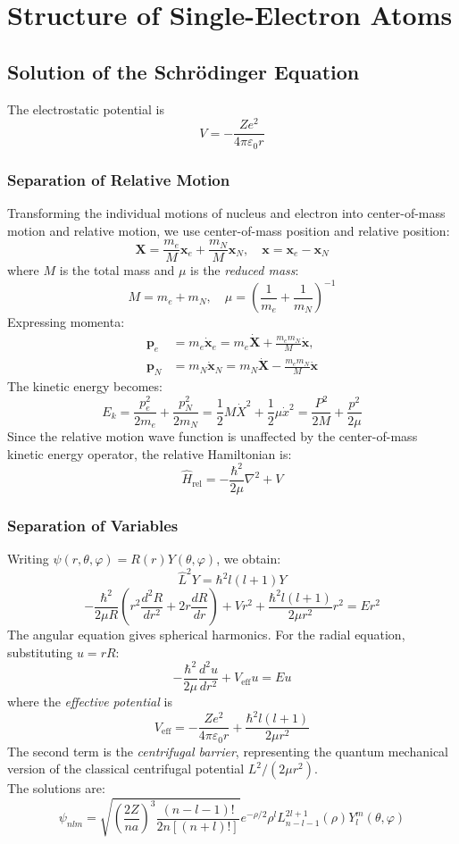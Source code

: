 \chapter{Structure of Single-Electron Atoms}



\section{Solution of the Schrödinger Equation}

The electrostatic potential is
\[
V = -\frac{Ze^2}{4\pi\varepsilon_0 r}
\]

\subsection{Separation of Relative Motion}

Transforming the individual motions of nucleus and electron into center-of-mass motion and relative motion, we use center-of-mass position and relative position:
\[
\mathbf{X} = \frac{m_e}{M}\mathbf{x}_e + \frac{m_N}{M}\mathbf{x}_N,
\quad
\mathbf{x} = \mathbf{x}_e - \mathbf{x}_N
\]
where $M$ is the total mass and $\mu$ is the \emph{reduced mass}:
\[
M = m_e + m_N, \quad \mu = \left(\frac{1}{m_e} + \frac{1}{m_N}\right)^{-1}
\]
Expressing momenta:
\[\begin{aligned}
\mathbf{p}_e &= m_e\dot{\mathbf{x}}_e = m_e\dot{\mathbf{X}} + \frac{m_e m_N}{M}\dot{\mathbf{x}},\\
\mathbf{p}_N &= m_N\dot{\mathbf{x}}_N = m_N\dot{\mathbf{X}} - \frac{m_e m_N}{M}\dot{\mathbf{x}}
\end{aligned}\]
The kinetic energy becomes:
\[
E_k = \frac{p_e^2}{2m_e} + \frac{p_N^2}{2m_N} = \frac{1}{2}M\dot{X}^2 + \frac{1}{2}\mu\dot{x}^2 = \frac{P^2}{2M} + \frac{p^2}{2\mu}
\]
Since the relative motion wave function is unaffected by the center-of-mass kinetic energy operator, the relative Hamiltonian is:
\[
\hat{H}_{\text{rel}} = -\frac{\hbar^2}{2\mu}\nabla^2 + V
\]

\subsection{Separation of Variables}

Writing $\psi(r,\theta,\varphi) = R(r)Y(\theta,\varphi)$, we obtain:
\[
\hat{L}^2 Y = \hbar^2 l(l+1) Y\]
\[
-\frac{\hbar^2}{2\mu R}\left(r^2\frac{d^2R}{dr^2} + 2r\frac{dR}{dr}\right) + Vr^2 + \frac{\hbar^2 l(l+1)}{2\mu r^2}r^2 = Er^2
\]
The angular equation gives spherical harmonics. For the radial equation, substituting $u = rR$:
\[
-\frac{\hbar^2}{2\mu}\frac{d^2u}{dr^2} + V_{\text{eff}}u = Eu
\]
where the \emph{effective potential} is
\[
V_{\text{eff}} = -\frac{Ze^2}{4\pi\varepsilon_0 r} + \frac{\hbar^2 l(l+1)}{2\mu r^2}
\]
The second term is the \emph{centrifugal barrier}, representing the quantum mechanical version of the classical centrifugal potential $L^2/(2\mu r^2)$.\\
The solutions are:
\[
\psi_{nlm} = \sqrt{\left(\frac{2Z}{na}\right)^3\frac{(n-l-1)!}{2n[(n+l)!]}}e^{-\rho/2}\rho^l L_{n-l-1}^{2l+1}(\rho)Y_l^m(\theta,\varphi)
\]


